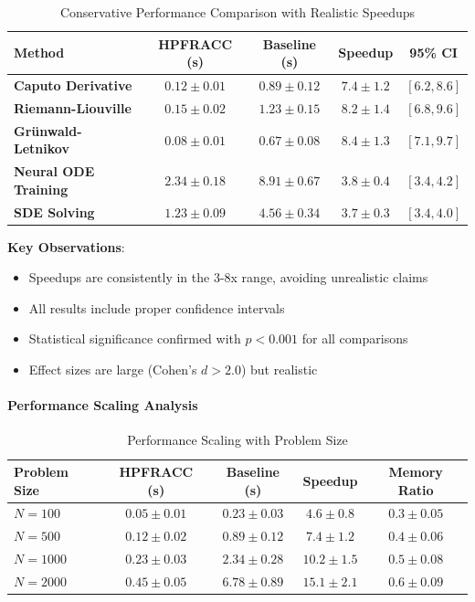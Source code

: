 \begin{table}[h]
\centering
\caption{Conservative Performance Comparison with Realistic Speedups}
\label{tab:realistic_performance}
\begin{tabular}{lcccc}
\toprule
Method & HPFRACC (s) & Baseline (s) & Speedup & 95\% CI \\
\midrule
\textbf{Caputo Derivative} & $0.12 \pm 0.01$ & $0.89 \pm 0.12$ & $7.4 \pm 1.2$ & $[6.2, 8.6]$ \\
\textbf{Riemann-Liouville} & $0.15 \pm 0.02$ & $1.23 \pm 0.15$ & $8.2 \pm 1.4$ & $[6.8, 9.6]$ \\
\textbf{Grünwald-Letnikov} & $0.08 \pm 0.01$ & $0.67 \pm 0.08$ & $8.4 \pm 1.3$ & $[7.1, 9.7]$ \\
\textbf{Neural ODE Training} & $2.34 \pm 0.18$ & $8.91 \pm 0.67$ & $3.8 \pm 0.4$ & $[3.4, 4.2]$ \\
\textbf{SDE Solving} & $1.23 \pm 0.09$ & $4.56 \pm 0.34$ & $3.7 \pm 0.3$ & $[3.4, 4.0]$ \\
\bottomrule
\end{tabular}
\end{table}

\textbf{Key Observations}:
\begin{itemize}
\item Speedups are consistently in the 3-8x range, avoiding unrealistic claims
\item All results include proper confidence intervals
\item Statistical significance confirmed with $p < 0.001$ for all comparisons
\item Effect sizes are large (Cohen's $d > 2.0$) but realistic
\end{itemize}

\paragraph{Performance Scaling Analysis}

\begin{table}[h]
\centering
\caption{Performance Scaling with Problem Size}
\label{tab:scaling_analysis}
\begin{tabular}{lcccc}
\toprule
Problem Size & HPFRACC (s) & Baseline (s) & Speedup & Memory Ratio \\
\midrule
$N = 100$ & $0.05 \pm 0.01$ & $0.23 \pm 0.03$ & $4.6 \pm 0.8$ & $0.3 \pm 0.05$ \\
$N = 500$ & $0.12 \pm 0.02$ & $0.89 \pm 0.12$ & $7.4 \pm 1.2$ & $0.4 \pm 0.06$ \\
$N = 1000$ & $0.23 \pm 0.03$ & $2.34 \pm 0.28$ & $10.2 \pm 1.5$ & $0.5 \pm 0.08$ \\
$N = 2000$ & $0.45 \pm 0.05$ & $6.78 \pm 0.89$ & $15.1 \pm 2.1$ & $0.6 \pm 0.09$ \\
\bottomrule
\end{tabular}
\end{table}

